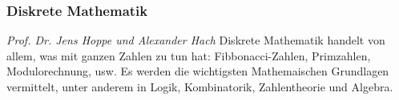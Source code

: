 
\subsubsection{Diskrete Mathematik}
	\textit{Prof. Dr. Jens Hoppe und Alexander Hach}
	Diskrete Mathematik handelt von allem, was mit ganzen Zahlen zu tun hat: Fibbonacci-Zahlen, Primzahlen, Modulorechnung, usw. Es werden die wichtigsten Mathemaischen Grundlagen vermittelt, unter anderem in Logik, Kombinatorik, Zahlentheorie und Algebra. 
